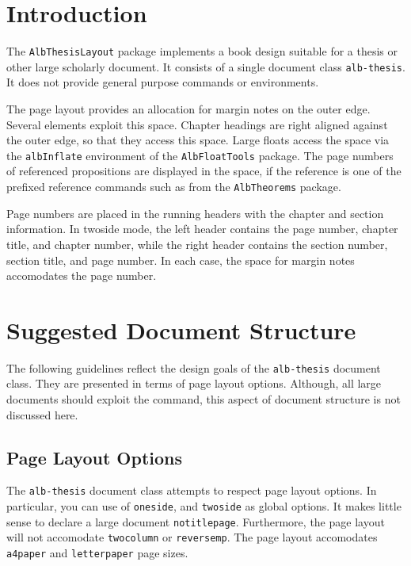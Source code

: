 \documentclass[11pt,a4paper,oneside,titlepage]{alb-latex}
\begin{document}

\section{Introduction}
\label{sec:alb-thesis:intr}

The \texttt{AlbThesisLayout} package implements a book design suitable
for a thesis or other large scholarly document.  It consists of a single
document class \texttt{alb-thesis}.  It does not provide general purpose
commands or environments.

The page layout provides an allocation for margin notes on the outer
edge.  Several elements exploit this space.  Chapter headings are right
aligned against the outer edge, so that they access this space.  Large
floats access the space via the \texttt{albInflate} environment of the
\texttt{AlbFloatTools} package.  The page numbers of referenced
propositions are displayed in the space, if the reference is one of the
prefixed reference commands such as  from the
\texttt{AlbTheorems} package.

Page numbers are placed in the running headers with the chapter and
section information.  In twoside mode, the left header contains the page
number, chapter title, and chapter number, while the right header
contains the section number, section title, and page number.  In each
case, the space for margin notes accomodates the page number.




\section{Suggested Document Structure}
\label{sec:alb-thesis:sugg-docum-struct}

The following guidelines reflect the design goals of the
\texttt{alb-thesis} document class.  They are presented in terms of page
layout options.  Although, all large documents should exploit the
 command, this aspect of document structure is not
discussed here.



\subsection{Page Layout Options}
\label{sec:alb-thesis:page-layout-opti}

The \texttt{alb-thesis} document class attempts to respect page layout
options.  In particular, you can use of \texttt{oneside}, and
\texttt{twoside} as global options.  It makes little sense to declare a
large document \texttt{notitlepage}.  Furthermore, the page layout will
not accomodate \texttt{twocolumn} or \texttt{reversemp}.  The page
layout accomodates \texttt{a4paper} and \texttt{letterpaper} page sizes.
\end{document}
